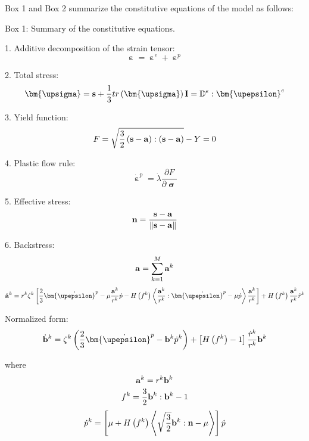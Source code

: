 Box 1 and Box 2 summarize the constitutive equations of the model as follows:

\begin{framed}
\label{Box:1}
Box 1: Summary of the constitutive equations.

1. Additive decomposition of the strain tensor:
\[{\bm{\upepsilon }} = {{\bm{\upepsilon }}^e} + {{\bm{\upepsilon }}^p}\]

2. Total stress:
\[{\bm{\upsigma }} = {\bf{s}} + \frac{1}{3}tr\left( {\bm{\upsigma }} \right){\bf{I}} = {\mathbb{D}^e}:{{\bm{\upepsilon }}^e}\]

3. Yield function:
\[F = \sqrt {\frac{3}{2}\left( {{\bf{s}} - {\bf{a}}} \right):\left( {{\bf{s}} - {\bf{a}}} \right)}  - Y = 0\]

4. Plastic flow rule:
\[{{\bm{\dot \upepsilon }}^p} = \dot \lambda \frac{{\partial F}}{{\partial {\bm{\upsigma }}}}\]

5. Effective stress:
\[{\bf{n}} = \frac{{{\bf{s}} - {\bf{a}}}}{{\left\| {{\bf{s}} - {\bf{a}}} \right\|}}\]

6. Backstress:
\[{\bf{a}} = \sum\limits_{k = 1}^M {{{\bf{a}}^k}} \]
\[{{\dot{\bf a}}^k} = {r^k}{\zeta ^k}\left[ {\frac{2}{3}{{{\bm{\dot \upepsilon }}}^p} - \mu \frac{{{{\bf{a}}^k}}}{{{r^k}}}\dot p - H\left( {{f^k}} \right)\left\langle {\frac{{{{\bf{a}}^k}}}{{{r^k}}}:{{{\bm{\dot \upepsilon }}}^p} - \mu \dot p} \right\rangle \frac{{{{\bf{a}}^k}}}{{{r^k}}}} \right] + H\left( {{f^k}} \right)\frac{{{{\bf{a}}^k}}}{{{r^k}}}{\dot r^k}\]

Normalized form:
\[{{\dot{\bf b}}^k} = {\zeta ^k}\left( {\frac{2}{3}{{{\bm{\dot \upepsilon }}}^p} - {{\bf{b}}^k}{{\dot p}^k}} \right) + \left[ {H\left( {{f^k}} \right) - 1} \right]\frac{{{{\dot r}^k}}}{{{r^k}}}{{\bf{b}}^k}\]

where
\[{{\bf{a}}^k} = {r^k}{{\bf{b}}^k}\]
\[{f^k} = \frac{3}{2}{{\bf{b}}^k}:{{\bf{b}}^k} - 1\]
\[{\dot p^k} = \left[ {\mu  + H\left( {{f^k}} \right)\left\langle {\sqrt {\frac{3}{2}} {{\bf{b}}^k}:{\bf{n}} - \mu } \right\rangle } \right]\dot p\]
\end{framed}


